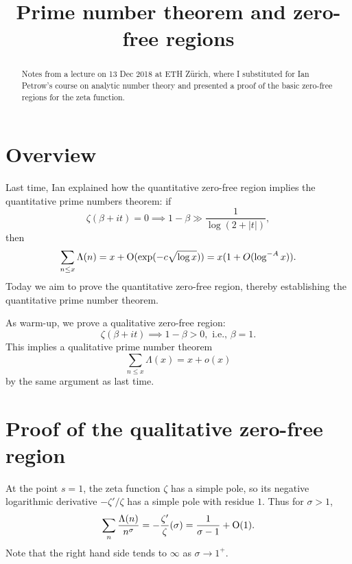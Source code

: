 \documentclass[reqno]{amsart} 
\begin{document}
\title{Prime number theorem and zero-free regions}

\begin{abstract}
  Notes from a lecture on 13 Dec 2018 at ETH Z\"urich, where I substituted for Ian Petrow's course on analytic number theory and presented a proof of the basic zero-free regions for the zeta function.
\end{abstract}

\section{Overview}
\label{sec:org55674c2}
Last time, Ian explained how the quantitative zero-free region implies the quantitative prime numbers theorem: if
\begin{equation}
  \zeta(\beta + i t) = 0 \implies 1 - \beta \gg \frac{1}{\log(2 + |t|)},
\end{equation}
then
\begin{equation}
  \sum_{n \leq x}
  \Lambda(n) = x + \operatorname{O}(\exp(- c \sqrt{\log x}))
  = x ( 1 + O(\log^{-A} x)).
\end{equation}
Today we aim to prove the quantitative zero-free region, thereby establishing the quantitative prime number theorem.

As warm-up, we prove a qualitative zero-free region:
\begin{equation}\label{eqn:qual-zfr}
  \zeta(\beta + i t) \implies 1 - \beta > 0, \text{ i.e., }
  \beta = 1.
\end{equation}
This implies a qualitative prime number theorem
\begin{equation}
  \sum_{n \leq x} \Lambda(x) = x + o(x)
\end{equation}
by the same argument as last time.

\section{Proof of the qualitative zero-free region}
\label{sec:org9ae21da}
At the point $s = 1$, the zeta function $\zeta$ has a simple pole, so its negative logarithmic derivative $ - \zeta ' / \zeta$ has a simple pole with residue $1$.  Thus for $\sigma > 1$,
\begin{equation}\label{eq:zeta-1}
  \sum_{n}
  \frac{\Lambda(n)}{n^{\sigma} }
  = - \frac{\zeta '}{ \zeta } (\sigma)
  = \frac{1}{\sigma - 1} + \operatorname{O}(1).
\end{equation}
Note that the right hand side tends to $\infty$ as $\sigma \rightarrow 1^+$.
\end{document}

